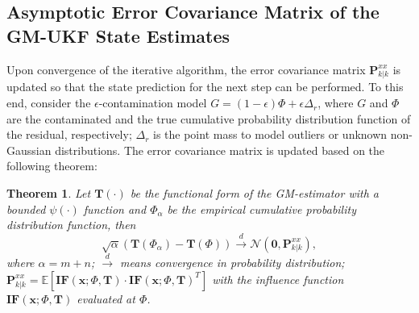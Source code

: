 \documentclass[10pt]{IEEEtran}
\newtheorem{theorem}{Theorem}
\begin{document}
\subsection{Asymptotic Error Covariance Matrix of the GM-UKF State Estimates}
Upon convergence of the iterative algorithm, the error covariance matrix $\bm{P}_{k\left|{k}\right.}^{xx}$ is updated so that the state prediction for the next step can be performed. To this end, consider the $\epsilon$-contamination model $G = \left( {1 - \epsilon } \right)\Phi + \epsilon {\Delta _r}$, where $G$ and $\Phi$ are the contaminated and the true cumulative probability distribution function of the residual, respectively; ${\Delta _r}$ is the point mass to model outliers or unknown non-Gaussian distributions. The error covariance matrix is updated based on the following theorem:
\vspace{-0.2cm}
\begin{theorem}
Let $\bm{T}(\cdot)$ be the functional form of the GM-estimator with a bounded $\psi(\cdot)$ function and $\Phi_\alpha$ be the empirical cumulative probability distribution function, then
\begin{equation}
\sqrt \alpha ( {\bm{T}( {{\Phi_\alpha }}) - \bm{T}(\Phi)})\mathop  \to \limits^d \mathcal{N}( {\bm{0},\bm{P}_{k| k }^{xx}}),
\label{Eq:Gaussian_convergence}
\end{equation}
where $\alpha=m+n$; $\mathop \to \limits^d$ means convergence in probability distribution; $\bm{P}_{k| k }^{xx}=\mathbb{E}[ {\bm{IF}(\bm{x};\Phi,\bm{T}) \cdot \bm{I{F}}(\bm{x};\Phi,\bm{T})^T}]$ with the influence function $\bm{IF}(\bm{x};\Phi,\bm{T})$ evaluated at $\Phi$.
\end{theorem}
\end{document}
